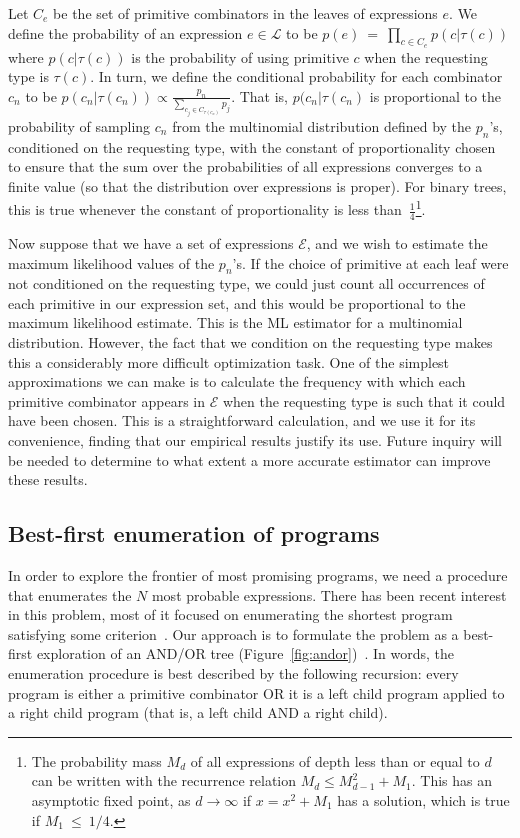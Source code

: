 \documentclass{article}
\begin{document}
Let $C_e$ be the set of primitive combinators in the leaves of
expressions $e$. We define the probability of an expression ${e \in
  \mathcal{L}}$ to be ${ p(e)~=~\prod_{c \in C_e} p(c | \tau(c)) }$
where $p(c | \tau(c))$ is the probability of using primitive $c$ when
the requesting type is $\tau(c)$. In turn, we define the conditional
probability for each combinator $c_n$ to be $p(c_n| \tau(c_n)) \propto
\frac{p_n}{\sum_{c_j \in C_{\tau(c_n)}} p_j}$.  That is, $p(c_n | \tau(c_n)$ is
proportional to the probability of sampling $c_n$ from the multinomial
distribution defined by the $p_n$'s, conditioned on the requesting
type, with the constant of proportionality chosen to ensure that the
sum over the probabilities of all expressions converges to a finite
value (so that the distribution over expressions is proper). For
binary trees, this is true whenever the constant of proportionality is
less than~$\frac{1}{4}$\footnote{The probability mass $M_d$ of all
  expressions of depth less than or equal to $d$ can be written with
  the recurrence relation $M_d \leq M_{d-1}^2 + M_1$. This has an
  asymptotic fixed point, as $d \rightarrow \infty$ if $x = x^2 + M_1$
  has a solution, which is true if $M_1~\leq~1/4$.}.

Now suppose that we have a set of expressions $\mathcal{E}$, and we
wish to estimate the maximum likelihood values of the $p_n$'s. If the
choice of primitive at each leaf were not conditioned on the
requesting type, we could just count all occurrences of each primitive
in our expression set, and this would be proportional to the maximum
likelihood estimate. This is the ML estimator for a multinomial
distribution. However, the fact that we condition on the requesting
type makes this a considerably more difficult optimization task. One
of the simplest approximations we can make is to calculate the
frequency with which each primitive combinator appears in
$\mathcal{E}$ when the requesting type is such that it could have
been chosen. This is a straightforward calculation, and
we use it for its convenience, finding that our empirical results
justify its use. Future inquiry will be needed to determine to what
extent a more accurate estimator can improve these results.

\subsection{Best-first enumeration of programs}
In order to explore the frontier of most promising programs, we need a
procedure that enumerates the $N$ most probable expressions. There has
been recent interest in this problem, most of it focused on
enumerating the shortest program satisfying some
criterion~\cite{DBLP:conf/sfp/Katayama05,DBLP:conf/aaip/YakushevJ09}. Our approach is to formulate the
problem as a best-first exploration of an AND/OR tree
(Figure~\ref{fig:andor})~\cite{nilsson1982principles,DBLP:journals/cacm/Hall73}. In
words, the enumeration procedure is best described by the following
recursion: every program is either a primitive combinator OR it is a
left child program applied to a right child program (that is, a left
child AND a right child).
\end{document}
